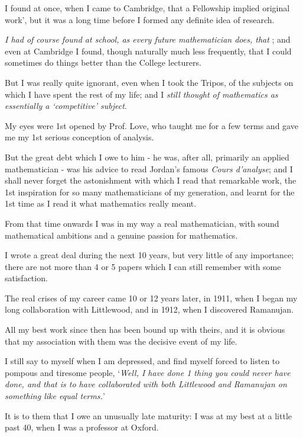\documentclass{article}
\numberwithin{equation}{section}
\begin{document}
%
I found at once, when I came to Cambridge, that a Fellowship implied original work', but it was a long time before I formed any definite idea of research.

\textit{I had of course found at school, as every future mathematician does, that }; and even at Cambridge I found, though naturally much less frequently, that I could sometimes do things better than the College lecturers.

But I was really quite ignorant, even when I took the Tripos, of the subjects on which I have spent the rest of my life; and I \textit{still thought of mathematics as essentially a `competitive' subject}.

My eyes were 1st opened by Prof. Love, who taught me for a few terms and gave me my 1st serious conception of analysis.

But the great debt which I owe to him - he was, after all, primarily an applied mathematician - was his advice to read Jordan's famous \textit{Cours d'analyse}; and I shall never forget the astonishment with which I read that remarkable work, the 1st inspiration for so many mathematicians of my generation, and learnt for the 1st time as I read it what mathematics really meant.

From that time onwards I was in my way a real mathematician, with sound mathematical ambitions and a genuine passion for mathematics.

%
I wrote a great deal during the next 10 years, but very little of any importance; there are not more than 4 or 5 papers which I can still remember with some satisfaction.

The real crises of my career came 10 or 12 years later, in 1911, when I began my long collaboration with Littlewood, and in 1912, when I discovered Ramanujan.

All my best work since then has been bound up with theirs, and it is obvious that my association with them was the decisive event of my life.

I still say to myself when I am depressed, and find myself forced to listen to pompous and tiresome people, `\textit{Well, I have done 1 thing \emph{you} could never have done, and that is to have collaborated with both Littlewood and Ramanujan on something like equal terms.}'

It is to them that I owe an unusually late maturity: I was at my best at a little past 40, when I was a professor at Oxford.
\end{document}
